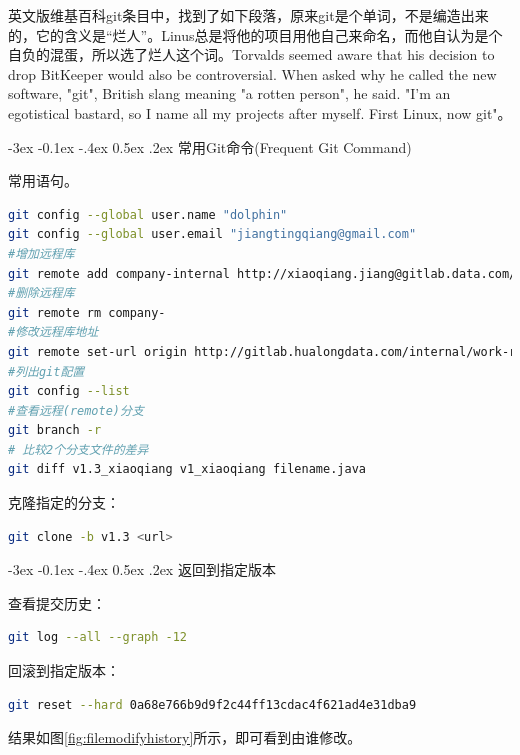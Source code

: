 \documentclass[12pt]{book}
\makeatletter
\numberwithin{dummy}{section}
\theoremstyle{ocrenumbox}
\theoremstyle{blacknumex}
\theoremstyle{blacknumbox}
\theoremstyle{ocrenum}
\renewcommand{\subsection}{\@startsection {subsection}{2}{\z@}
	{-3ex \@plus -0.1ex \@minus -.4ex}
	{0.5ex \@plus.2ex }
	{\normalfont\sffamily\bfseries}}
\makeatother
\begin{document}
英文版维基百科git条目中，找到了如下段落，原来git是个单词，不是编造出来的，它的含义是“烂人”。Linus总是将他的项目用他自己来命名，而他自认为是个自负的混蛋，所以选了烂人这个词。Torvalds seemed aware that his decision to drop BitKeeper would also be controversial. When asked why he called the new software, "git", British slang meaning "a rotten person", he said. "I'm an egotistical bastard, so I name all my projects after myself. First Linux, now git"。

\subsection{常用Git命令(Frequent Git Command)}

常用语句。

\begin{lstlisting}[language=Bash]
git config --global user.name "dolphin"
git config --global user.email "jiangtingqiang@gmail.com"
#增加远程库
git remote add company-internal http://xiaoqiang.jiang@gitlab.data.com/backend/system.git
#删除远程库
git remote rm company-
#修改远程库地址
git remote set-url origin http://gitlab.hualongdata.com/internal/work-record.git
#列出git配置
git config --list
#查看远程(remote)分支
git branch -r
# 比较2个分支文件的差异
git diff v1.3_xiaoqiang v1_xiaoqiang filename.java
\end{lstlisting}

克隆指定的分支：

\begin{lstlisting}[language=Bash]
git clone -b v1.3 <url>
\end{lstlisting}

\subsection{返回到指定版本}

查看提交历史：

\begin{lstlisting}[language=Bash]
git log --all --graph -12
\end{lstlisting}

回滚到指定版本：

\begin{lstlisting}[language=Bash]
git reset --hard 0a68e766b9d9f2c44ff13cdac4f621ad4e31dba9
\end{lstlisting}

结果如图\ref{fig:filemodifyhistory}所示，即可看到由谁修改。
\end{document}
